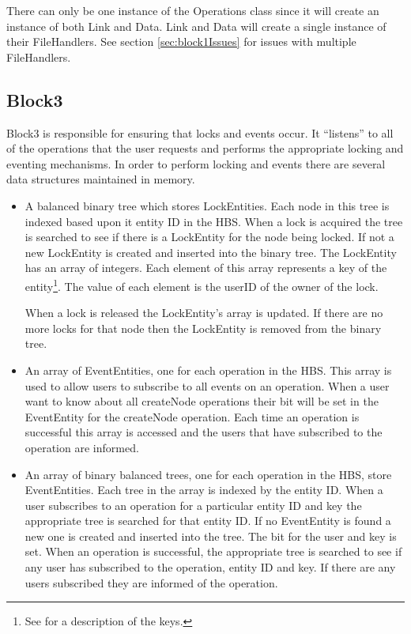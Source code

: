 There can only be one instance of the Operations class since it will create
an instance of both Link and Data.  Link and Data will create a single
instance of their FileHandlers.  See section \ref{sec:block1Issues} for issues with
multiple FileHandlers.

\subsection{Block3}

Block3 is responsible for ensuring that locks and events occur.  It
``listens'' to all of the operations that the user requests and performs
the appropriate locking and eventing mechanisms.  In order to perform
locking and events there are several data structures maintained in
memory. 

\begin{itemize} 

\item A balanced binary tree which stores LockEntities.  Each node in this
  tree is indexed based upon it entity ID in the HBS.  When a lock is
  acquired the tree is searched to see if there is a LockEntity for the node
  being locked.  If not a new LockEntity is created and inserted into the
  binary tree.  The LockEntity has an array of integers.  Each element of
  this array represents a key of the entity\footnote{See \cite{Wiil90a} for a
  description of the keys.}.  The value of each element is the userID of the
  owner of the lock. 

  When a lock is released the LockEntity's array is updated.  If there are
  no more locks for that node then the LockEntity is removed from the
  binary tree.

\item An array of EventEntities, one for each operation in the HBS.  This
  array is used to allow users to subscribe to all events on an operation.
  When a user want to know about all createNode operations their bit will be
  set in the EventEntity for the createNode operation.  Each time an
  operation is successful this array is accessed and the users that have
  subscribed to the operation are informed.

\item An array of binary balanced trees, one for each operation in the HBS,
  store EventEntities.  Each tree in the array is indexed by the entity ID.
  When a user subscribes to an operation for a particular entity ID and key the
  appropriate tree is searched for that entity ID.  If no EventEntity is
  found a new one is created and inserted into the tree.  The bit for the
  user and key is set.  When an operation is successful, the appropriate tree is
  searched to see if any user has subscribed to the operation, entity ID
  and key.  If there are any users subscribed they are informed of the operation.

\end{itemize}

